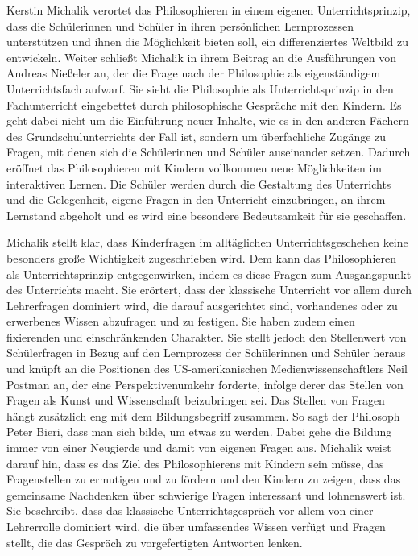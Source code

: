 Kerstin Michalik verortet das Philosophieren in einem eigenen Unterrichtsprinzip, dass die Schülerinnen und Schüler in ihren persönlichen Lernprozessen unterstützen und ihnen die Möglichkeit bieten soll, ein differenziertes Weltbild zu entwickeln\cite{KM13, S.635}. 
Weiter schließt Michalik in ihrem Beitrag an die Ausführungen von Andreas Nießeler an, der die Frage nach der Philosophie als eigenständigem Unterrichtsfach aufwarf. 
Sie sieht die Philosophie als Unterrichtsprinzip in den Fachunterricht eingebettet durch philosophische Gespräche mit den Kindern. 
Es geht dabei nicht um die Einführung neuer Inhalte, wie es in den anderen Fächern des Grundschulunterrichts der Fall ist, sondern um überfachliche Zugänge zu Fragen, mit denen sich die Schülerinnen und Schüler auseinander setzen. 
Dadurch eröffnet das Philosophieren mit Kindern vollkommen neue Möglichkeiten im interaktiven Lernen. 
Die Schüler werden durch die Gestaltung des Unterrichts und die Gelegenheit, eigene Fragen in den Unterricht einzubringen, an ihrem Lernstand abgeholt und es wird eine besondere Bedeutsamkeit für sie geschaffen.

Michalik stellt klar, dass Kinderfragen im alltäglichen Unterrichtsgeschehen keine besonders große Wichtigkeit zugeschrieben wird. 
Dem kann das Philosophieren als Unterrichtsprinzip entgegenwirken, indem es diese Fragen zum Ausgangspunkt des Unterrichts macht. 
Sie erörtert, dass der klassische Unterricht vor allem durch Lehrerfragen dominiert wird, die darauf ausgerichtet sind, vorhandenes oder zu erwerbenes Wissen abzufragen und zu festigen. 
Sie haben zudem einen \glqq fixierenden und einschränkenden Charakter\grqq{}\cite{KM13, S.635}. 
Sie stellt jedoch den Stellenwert von Schülerfragen in Bezug auf den Lernprozess der Schülerinnen und Schüler heraus und knüpft an die Positionen des US-amerikanischen Medienwissenschaftlers Neil Postman an, der eine Perspektivenumkehr forderte, infolge derer das Stellen von Fragen als \glqq Kunst und Wissenschaft beizubringen\grqq{}\cite{KM13, S.636} sei. 
Das Stellen von Fragen hängt zusätzlich eng mit dem Bildungsbegriff zusammen. 
So sagt der Philosoph Peter Bieri, dass man sich bilde, um etwas zu werden. 
Dabei gehe die Bildung immer von einer Neugierde und damit von eigenen Fragen aus.
Michalik weist darauf hin, dass es das Ziel des Philosophierens mit Kindern sein müsse, \glqq das Fragenstellen zu ermutigen und zu fördern und den Kindern zu zeigen, dass das gemeinsame Nachdenken über schwierige Fragen interessant und lohnenswert ist.\grqq{}\cite{KM13, S.637}
Sie beschreibt, dass das klassische Unterrichtsgespräch vor allem von einer Lehrerrolle dominiert wird, die über umfassendes Wissen verfügt und Fragen stellt, die das Gespräch zu vorgefertigten Antworten lenken.

